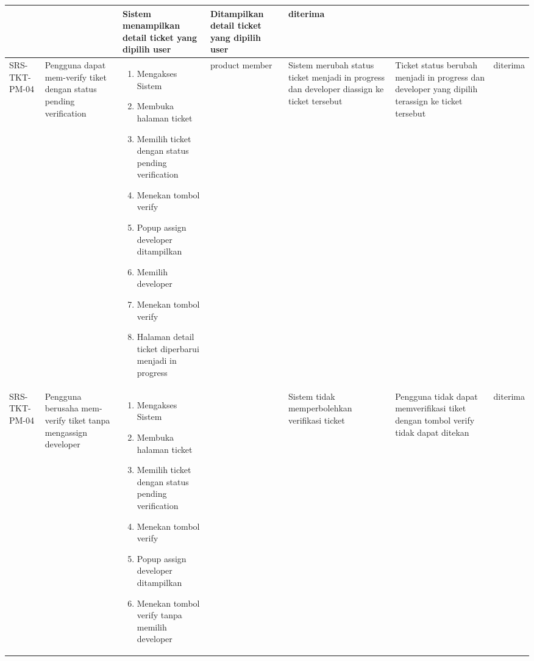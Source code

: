 \documentclass[12pt]{article}
\begin{document}
\begin{enumerate}[label=\textbf{5.\arabic*.}]
\begin{enumerate}[label=\textbf{5.2.\arabic*.}]
\begin{landscape}
\begin{longtable}{ |l|p{}|p{}|p{}|p{}|p{}|l| }
\begin{enumerate}[label=\arabic*.]
                \end{enumerate} 
                &  & Sistem menampilkan detail ticket yang dipilih user & Ditampilkan detail ticket yang dipilih user & diterima \\
                \hline
                SRS-TKT-PM-04 & Pengguna dapat mem-verify tiket dengan status pending verification & 
                \begin{enumerate}[label=\arabic*.] 
                    \item Mengakses Sistem
                    \item Membuka halaman ticket
                    \item Memilih ticket dengan status pending verification
                    \item Menekan tombol verify
                    \item Popup assign developer ditampilkan
                    \item Memilih developer
                    \item Menekan tombol verify
                    \item Halaman detail ticket diperbarui menjadi in progress
                \end{enumerate} 
                & product member & Sistem merubah status ticket menjadi in progress dan developer diassign ke ticket tersebut 
                & Ticket status berubah menjadi in progress dan developer yang dipilih terassign ke ticket tersebut & diterima \\
                \hline
                SRS-TKT-PM-04 & Pengguna berusaha mem-verify tiket tanpa mengassign developer & 
                \begin{enumerate}[label=\arabic*.] 
                    \item Mengakses Sistem
                    \item Membuka halaman ticket
                    \item Memilih ticket dengan status pending verification
                    \item Menekan tombol verify
                    \item Popup assign developer ditampilkan
                    \item Menekan tombol verify tanpa memilih developer
                \end{enumerate} 
                &  & Sistem tidak memperbolehkan verifikasi ticket 
                & Pengguna tidak dapat memverifikasi tiket dengan tombol verify tidak dapat ditekan & diterima \\

\end{longtable}
\end{landscape}
\end{enumerate}
\end{enumerate}
\end{document}
